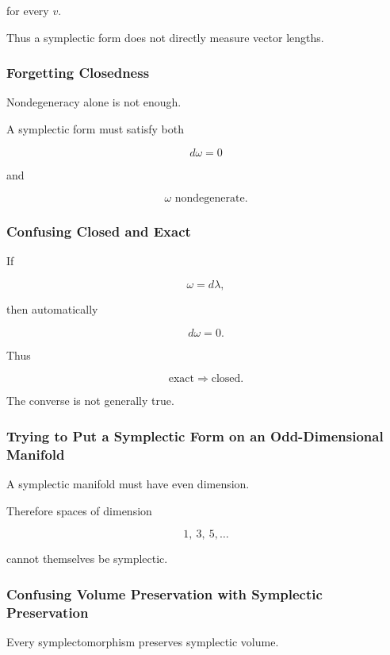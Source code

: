 for every \(v\).

Thus a symplectic form does not directly measure vector lengths.

\subsubsection{Forgetting Closedness}

Nondegeneracy alone is not enough.

A symplectic form must satisfy both

\[
\boxed{
d\omega=0
}
\]

and

\[
\boxed{
\omega\text{ nondegenerate}.
}
\]

\subsubsection{Confusing Closed and Exact}

If

\[
\omega=d\lambda,
\]

then automatically

\[
d\omega=0.
\]

Thus

\[
\boxed{
\text{exact}
\Longrightarrow
\text{closed}.
}
\]

The converse is not generally true.

\subsubsection{Trying to Put a Symplectic Form on an Odd-Dimensional Manifold}

A symplectic manifold must have even dimension.

Therefore spaces of dimension

\[
1,\ 3,\ 5,\ldots
\]

cannot themselves be symplectic.

\subsubsection{Confusing Volume Preservation with Symplectic Preservation}

Every symplectomorphism preserves symplectic volume.

